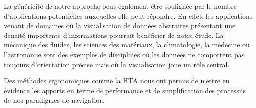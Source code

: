 La généricité de notre approche peut également être soulignée par le nombre d'applications potentielles auxquelles elle peut répondre. En effet, les applications venant de domaines où la visualisation de données abstraites présentant une densité importante d'informations pourrait bénéficier de notre étude. La mécanique des fluides, les sciences des matériaux, la climatologie, la médecine ou l'astronomie sont des exemples de disciplines où les données ne comportent pas toujours d'orientation précise mais où la visualisation joue un rôle central.

Des méthodes ergonomiques comme la HTA nous ont permis de mettre en évidence les apports en terme de performance et de simplification des processus de nos paradigmes de navigation. 







